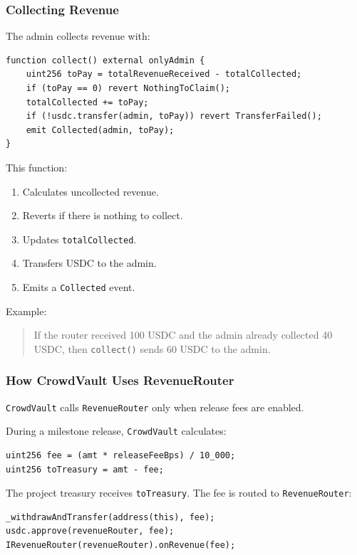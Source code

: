 \documentclass[11pt,a4paper]{article}
\begin{document}
\subsubsection{Collecting Revenue}

The admin collects revenue with:

\begin{lstlisting}
function collect() external onlyAdmin {
    uint256 toPay = totalRevenueReceived - totalCollected;
    if (toPay == 0) revert NothingToClaim();
    totalCollected += toPay;
    if (!usdc.transfer(admin, toPay)) revert TransferFailed();
    emit Collected(admin, toPay);
}
\end{lstlisting}

This function:

\begin{enumerate}
  \item Calculates uncollected revenue.
  \item Reverts if there is nothing to collect.
  \item Updates \texttt{totalCollected}.
  \item Transfers USDC to the admin.
  \item Emits a \texttt{Collected} event.
\end{enumerate}

Example:

\begin{quote}
If the router received 100 USDC and the admin already collected 40 USDC, then \texttt{collect()} sends 60 USDC to the admin.
\end{quote}

\subsubsection{How CrowdVault Uses RevenueRouter}

\texttt{CrowdVault} calls \texttt{RevenueRouter} only when release fees are enabled.

During a milestone release, \texttt{CrowdVault} calculates:

\begin{lstlisting}
uint256 fee = (amt * releaseFeeBps) / 10_000;
uint256 toTreasury = amt - fee;
\end{lstlisting}

The project treasury receives \texttt{toTreasury}. The fee is routed to \texttt{RevenueRouter}:

\begin{lstlisting}
_withdrawAndTransfer(address(this), fee);
usdc.approve(revenueRouter, fee);
IRevenueRouter(revenueRouter).onRevenue(fee);
\end{lstlisting}
\end{document}
